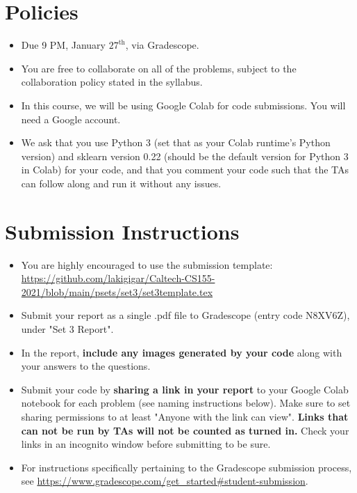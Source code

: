 \newif\ifshowsolutions
\showsolutionstrue







\pagestyle{fancy}




\section*{Policies}
\begin{itemize}
  \item Due 9 PM, January $27^\text{th}$, via Gradescope.
  \item You are free to collaborate on all of the problems, subject to the collaboration policy stated in the syllabus.
  \item In this course, we will be using Google Colab for code submissions. You will need a Google account.
  \item We ask that you use Python 3 (set that as your Colab runtime's Python version) and sklearn version 0.22 (should be the default version for Python 3 in Colab) for your code, and that you comment your code such that the TAs can follow along and run it without any issues.
\end{itemize}

\section*{Submission Instructions}
\begin{itemize}
   \item You are highly encouraged to use the submission template: \url{https://github.com/lakigigar/Caltech-CS155-2021/blob/main/psets/set3/set3template.tex}
   \item Submit your report as a single .pdf file to Gradescope (entry code N8XV6Z), under "Set 3 Report". 
   \item In the report, \textbf{include any images generated by your code} along with your answers to the questions.
   \item Submit your code by \textbf{sharing a link in your report} to your Google Colab notebook for each problem (see naming instructions below). Make sure to set sharing permissions to at least "Anyone with the link can view". \textbf{Links that can not be run by TAs will not be counted as turned in.} Check your links in an incognito window before submitting to be sure. 
   \item For instructions specifically pertaining to the Gradescope submission process, see \url{https://www.gradescope.com/get_started#student-submission}.

\end{itemize}


